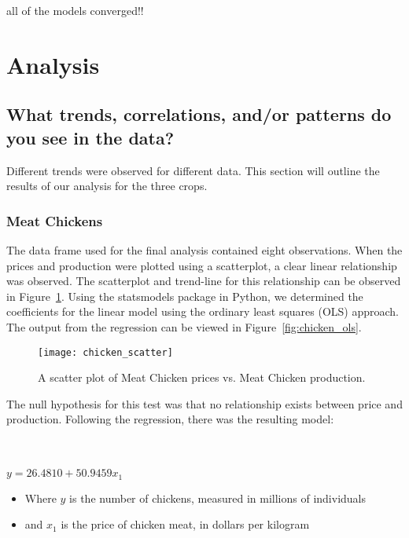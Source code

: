 
all of the models converged!!



\section{Analysis}

\subsection{What trends, correlations, and/or patterns do you see in the data?}

Different trends were observed for different data. This section will outline the results of our analysis for the three crops.

\subsubsection{Meat Chickens}

The data frame used for the final analysis contained eight observations.
When the prices and production were plotted using a scatterplot, a clear linear relationship was observed.
The scatterplot and trend-line for this relationship can be observed in Figure~\ref{fig:chicken_scatter}.
Using the statsmodels package in Python, we determined the coefficients for the linear model using the ordinary least squares (OLS) approach.
The output from the regression can be viewed in Figure~\ref{fig:chicken_ols}.

\begin{figure}
    \texttt{[image: chicken\_scatter]}
    \caption{A scatter plot of Meat Chicken prices vs. Meat Chicken production.}
    \label{fig:chicken_scatter}
\end{figure}

The null hypothesis for this test was that no relationship exists between price and production.
Following the regression, there was the resulting model:

\\~\\

\tabto{5cm} $y = 26.4810 + 50.9459x_1$


\begin{itemize}
    \item Where $y$ is the number of chickens, measured in millions of individuals
    \item and $x_1$ is the price of chicken meat, in dollars per kilogram
\end{itemize}

